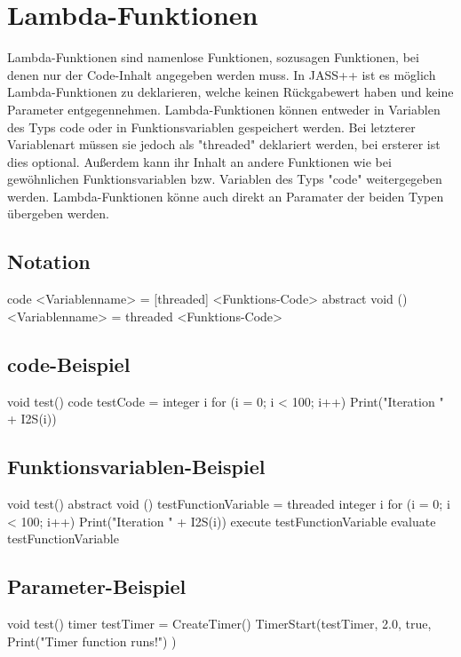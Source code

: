 \chapter{Lambda-Funktionen}
Lambda-Funktionen sind namenlose Funktionen, sozusagen Funktionen, bei denen nur der Code-Inhalt angegeben werden muss.
In JASS++ ist es möglich Lambda-Funktionen zu deklarieren, welche keinen Rückgabewert haben und keine Parameter entgegennehmen.
Lambda-Funktionen können entweder in Variablen des Typs code oder in Funktionsvariablen gespeichert werden. Bei letzterer Variablenart
müssen sie jedoch als "threaded" deklariert werden, bei ersterer ist dies optional.
Außerdem kann ihr Inhalt an andere Funktionen wie bei gewöhnlichen Funktionsvariablen bzw. Variablen des Typs "code" weitergegeben
werden.
Lambda-Funktionen könne auch direkt an Paramater der beiden Typen übergeben werden.

\section{Notation}
code <Variablenname> = [threaded]
	<Funktions-Code>
abstract void () <Variablenname> = threaded
	<Funktions-Code>

\section{code-Beispiel}
void test()
	code testCode =
		integer i
		for (i = 0; i < 100; i++)
			Print("Iteration " + I2S(i))

\section{Funktionsvariablen-Beispiel}
void test()
	abstract void () testFunctionVariable = threaded
		integer i
		for (i = 0; i < 100; i++)
			Print("Iteration " + I2S(i))
	execute testFunctionVariable
	evaluate testFunctionVariable

\section{Parameter-Beispiel}
void test()
	timer testTimer = CreateTimer()
	TimerStart(testTimer, 2.0, true,
		Print("Timer function runs!")
	)